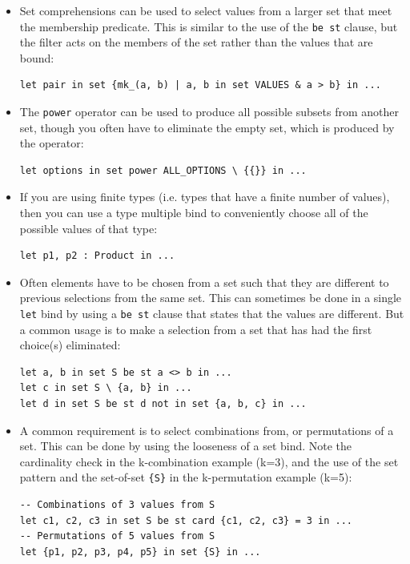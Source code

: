 \documentclass{overturerepchap}
\begin{document}
\begin{itemize}
  \item Set comprehensions can be used to select values from a larger set that
  meet the membership predicate. This is similar to the use of the \texttt{be
  st} clause, but the filter acts on the members of the set rather than the
  values that are bound:
\small
\begin{lstlisting}
let pair in set {mk_(a, b) | a, b in set VALUES & a > b} in ...
\end{lstlisting}
\normalsize
  \item The \texttt{power} operator can be used to produce all possible subsets
  from another set, though you often have to eliminate the empty set, which is
  produced by the operator:
\small
\begin{lstlisting}
let options in set power ALL_OPTIONS \ {{}} in ...
\end{lstlisting}
\normalsize
  \item If you are using finite types (i.e. types that have a finite number of
  values), then you can use a type multiple bind to conveniently choose all of
  the possible values of that type:
\small
\begin{lstlisting}
let p1, p2 : Product in ...
\end{lstlisting}
\normalsize
  \item Often elements have to be chosen from a set such that they are different
  to previous selections from the same set. This can sometimes be done in a
  single \texttt{let} bind by using a \texttt{be st} clause that states that the
  values are different. But a common usage is to make a selection from a set
  that has had the first choice(s) eliminated:
\small
\begin{lstlisting}
let a, b in set S be st a <> b in ...
let c in set S \ {a, b} in ...
let d in set S be st d not in set {a, b, c} in ...
\end{lstlisting}
\normalsize
  \item A common requirement is to select combinations from, or permutations
  of a set. This can be done by using the looseness of a set bind. Note the
  cardinality check in the k-combination example (k=3), and the use of the set
  pattern and the set-of-set \texttt{\{S\}} in the k-permutation example (k=5):
\small
\begin{lstlisting}
-- Combinations of 3 values from S
let c1, c2, c3 in set S be st card {c1, c2, c3} = 3 in ...
-- Permutations of 5 values from S
let {p1, p2, p3, p4, p5} in set {S} in ...
\end{lstlisting}
\normalsize
\end{itemize}
\end{document}

